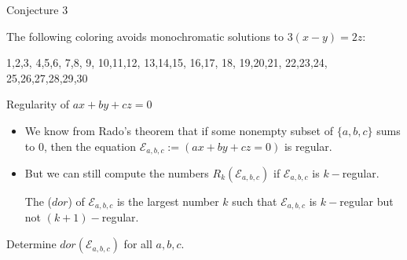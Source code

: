 \documentclass{beamer}
\begin{document}
\begin{frame}{Conjecture 3}
\begin{example}
	The following coloring avoids monochromatic solutions to $3(x-y) = 2z$: 
	\vspace{15pt}
	
\small{	{\color{blue} 1,2},{\color{red}3},{\color{blue} 4,5},{\color{red}6},{\color{green} 7,8},{\color{blue} 9},{\color{green} 10,11},{\color{red}12},{\color{green} 13,14},{\color{red}15},{\color{green} 16,17},{\color{blue} 18},{\color{green} 19,20},{\color{red}21},{\color{green} 22,23},{\color{red}24},{\color{blue} 25,26},{\color{green}27},{\color{blue}28,29},{\color{red}30}}


\end{example}
\end{frame}

\begin{frame}{Regularity of $ax+by+cz = 0$}
\begin{itemize}
\item We know from Rado's theorem that if some nonempty subset of $\{a,b,c\}$ sums to 0, then the equation $\mathcal{E}_{a,b,c} := (ax+by+cz = 0)$ is regular. 

\item \pause But we can still compute the numbers $R_k(\mathcal{E}_{a,b,c})$ if $\mathcal{E}_{a,b,c}$ is $k-$regular. 

\pause 
\begin{definition}The {\color{blue}{degree of regularity} ($dor$)} of $\mathcal{E}_{a,b,c}$ is the largest number $k$ such that $\mathcal{E}_{a,b,c}$ is $k-$regular but not $(k+1)-$regular.
\end{definition}
\end{itemize}

\pause
\begin{problem}
	Determine $dor(\mathcal{E}_{a,b,c})$ for all $a,b,c$. 
\end{problem}
\end{frame}
\end{document}
